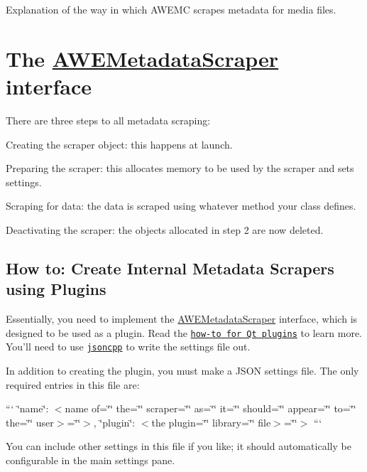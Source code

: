 Explanation of the way in which A\-W\-E\-M\-C scrapes metadata for media files.

\section*{The \hyperlink{class_a_w_e_metadata_scraper}{A\-W\-E\-Metadata\-Scraper} interface}

There are three steps to all metadata scraping\-:


\begin{DoxyEnumerate}
\item Creating the scraper object\-: this happens at launch.
\item Preparing the scraper\-: this allocates memory to be used by the scraper and sets settings.
\item Scraping for data\-: the data is scraped using whatever method your class defines.
\item Deactivating the scraper\-: the objects allocated in step 2 are now deleted.
\end{DoxyEnumerate}

\subsection*{How to\-: Create Internal Metadata Scrapers using Plugins}

Essentially, you need to implement the {\ttfamily \hyperlink{class_a_w_e_metadata_scraper}{A\-W\-E\-Metadata\-Scraper}} interface, which is designed to be used as a plugin. Read the \href{http://qt-project.org/doc/qt-4.8/plugins-howto.html}{\tt how-\/to for Qt plugins} to learn more. You'll need to use \href{http://jsoncpp.sourceforge.net}{\tt jsoncpp} to write the settings file out.

In addition to creating the plugin, you must make a J\-S\-O\-N settings file. The only required entries in this file are\-:

``` \char`\"{}name\char`\"{}\-: $<$name of=\char`\"{}\char`\"{} the=\char`\"{}\char`\"{} scraper=\char`\"{}\char`\"{} as=\char`\"{}\char`\"{} it=\char`\"{}\char`\"{} should=\char`\"{}\char`\"{} appear=\char`\"{}\char`\"{} to=\char`\"{}\char`\"{} the=\char`\"{}\char`\"{} user$>$=\char`\"{}\char`\"{}$>$, \char`\"{}plugin\char`\"{}\-: $<$the plugin=\char`\"{}\char`\"{} library=\char`\"{}\char`\"{} file$>$=\char`\"{}\char`\"{}$>$ ```

You can include other settings in this file if you like; it should automatically be configurable in the main settings pane.

